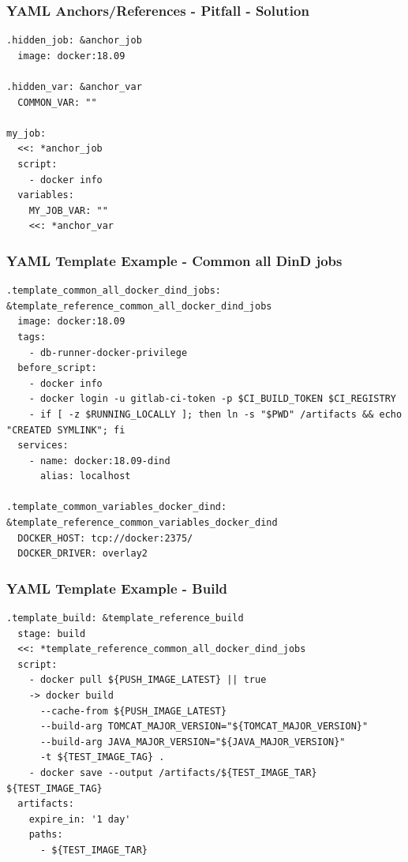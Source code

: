\documentclass[14pt,aspectratio=169]{beamer}
\begin{document}
\begin{frame}[fragile]
  \frametitle{YAML Anchors/References - Pitfall - Solution}
  \begin{verbatim}
.hidden_job: &anchor_job
  image: docker:18.09

.hidden_var: &anchor_var
  COMMON_VAR: ""

my_job:
  <<: *anchor_job
  script:
    - docker info
  variables:
    MY_JOB_VAR: ""
    <<: *anchor_var
  \end{verbatim}
\end{frame}

\begin{frame}[fragile]
  \frametitle{YAML Template Example - Common all DinD jobs}
  \begin{verbatim}
.template_common_all_docker_dind_jobs: &template_reference_common_all_docker_dind_jobs
  image: docker:18.09
  tags:
    - db-runner-docker-privilege
  before_script:
    - docker info
    - docker login -u gitlab-ci-token -p $CI_BUILD_TOKEN $CI_REGISTRY
    - if [ -z $RUNNING_LOCALLY ]; then ln -s "$PWD" /artifacts && echo "CREATED SYMLINK"; fi
  services:
    - name: docker:18.09-dind
      alias: localhost

.template_common_variables_docker_dind: &template_reference_common_variables_docker_dind
  DOCKER_HOST: tcp://docker:2375/
  DOCKER_DRIVER: overlay2
  \end{verbatim}
\end{frame}

\begin{frame}[fragile]
  \frametitle{YAML Template Example - Build}
  \begin{verbatim}
.template_build: &template_reference_build
  stage: build
  <<: *template_reference_common_all_docker_dind_jobs
  script:
    - docker pull ${PUSH_IMAGE_LATEST} || true
    -> docker build
      --cache-from ${PUSH_IMAGE_LATEST}
      --build-arg TOMCAT_MAJOR_VERSION="${TOMCAT_MAJOR_VERSION}"
      --build-arg JAVA_MAJOR_VERSION="${JAVA_MAJOR_VERSION}"
      -t ${TEST_IMAGE_TAG} .
    - docker save --output /artifacts/${TEST_IMAGE_TAR} ${TEST_IMAGE_TAG}
  artifacts:
    expire_in: '1 day'
    paths:
      - ${TEST_IMAGE_TAR}
  \end{verbatim}
\end{frame}
\end{document}
